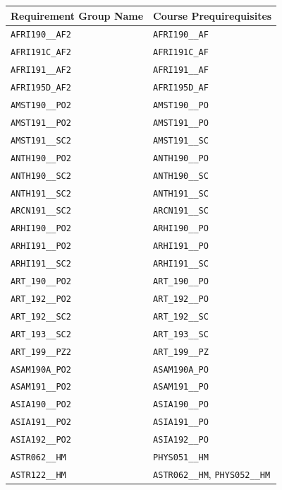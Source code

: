 \begin{longtable}{|p{4.4in}|p{4.4in}|}
    \hline
    Requirement Group Name & Course Prequirequisites\\\hline
    \verb|AFRI190__AF2| & \verb|AFRI190__AF|\\\hline
    \verb|AFRI191C_AF2| & \verb|AFRI191C_AF|\\\hline
    \verb|AFRI191__AF2| & \verb|AFRI191__AF|\\\hline
    \verb|AFRI195D_AF2| & \verb|AFRI195D_AF|\\\hline
    \verb|AMST190__PO2| & \verb|AMST190__PO|\\\hline
    \verb|AMST191__PO2| & \verb|AMST191__PO|\\\hline
    \verb|AMST191__SC2| & \verb|AMST191__SC|\\\hline
    \verb|ANTH190__PO2| & \verb|ANTH190__PO|\\\hline
    \verb|ANTH190__SC2| & \verb|ANTH190__SC|\\\hline
    \verb|ANTH191__SC2| & \verb|ANTH191__SC|\\\hline
    \verb|ARCN191__SC2| & \verb|ARCN191__SC|\\\hline
    \verb|ARHI190__PO2| & \verb|ARHI190__PO|\\\hline
    \verb|ARHI191__PO2| & \verb|ARHI191__PO|\\\hline
    \verb|ARHI191__SC2| & \verb|ARHI191__SC|\\\hline
    \verb|ART_190__PO2| & \verb|ART_190__PO|\\\hline
    \verb|ART_192__PO2| & \verb|ART_192__PO|\\\hline
    \verb|ART_192__SC2| & \verb|ART_192__SC|\\\hline
    \verb|ART_193__SC2| & \verb|ART_193__SC|\\\hline
    \verb|ART_199__PZ2| & \verb|ART_199__PZ|\\\hline
    \verb|ASAM190A_PO2| & \verb|ASAM190A_PO|\\\hline
    \verb|ASAM191__PO2| & \verb|ASAM191__PO|\\\hline
    \verb|ASIA190__PO2| & \verb|ASIA190__PO|\\\hline
    \verb|ASIA191__PO2| & \verb|ASIA191__PO|\\\hline
    \verb|ASIA192__PO2| & \verb|ASIA192__PO|\\\hline
    \verb|ASTR062__HM| & \verb|PHYS051__HM|\\\hline
    \verb|ASTR122__HM| & \verb|ASTR062__HM|, \verb|PHYS052__HM|\\\hline

\end{longtable}
